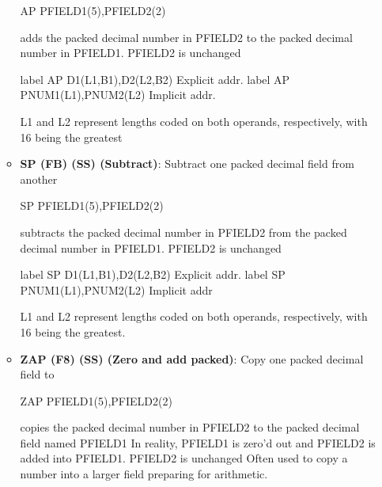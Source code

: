 \documentclass{report}
\begin{document}
\begin{itemize}
\begin{itemize}
\begin{cppcode}
                    AP PFIELD1(5),PFIELD2(2)
                    \end{cppcode}
                    \bigbreak \noindent 
                    adds the packed decimal number in PFIELD2 to the packed decimal number in PFIELD1. PFIELD2 is unchanged
                    \bigbreak \noindent 
                    \begin{cppcode}
                        label AP D1(L1,B1),D2(L2,B2) Explicit addr.
                        label AP PNUM1(L1),PNUM2(L2) Implicit addr.
                    \end{cppcode}
                    \bigbreak \noindent 
                    L1 and L2 represent lengths coded on both operands, respectively, with 16 being the greatest
                \item \textbf{SP (FB) (SS) (Subtract)}: Subtract one packed decimal field from another
                    \bigbreak \noindent 
                    \begin{cppcode}
                    SP PFIELD1(5),PFIELD2(2)
                    \end{cppcode}
                    \bigbreak \noindent 
                    subtracts the packed decimal number in PFIELD2 from the packed decimal number in PFIELD1. PFIELD2 is unchanged
                    \bigbreak \noindent 
                    \begin{cppcode}
                        label SP D1(L1,B1),D2(L2,B2) Explicit addr.
                        label SP PNUM1(L1),PNUM2(L2) Implicit addr
                    \end{cppcode}
                    \bigbreak \noindent 
                    L1 and L2 represent lengths coded on both operands, respectively, with 16 being the greatest.
                \item \textbf{ZAP (F8) (SS) (Zero and add packed)}: Copy one packed decimal field to
                    \bigbreak \noindent 
                    \begin{cppcode}
                    ZAP PFIELD1(5),PFIELD2(2)
                    \end{cppcode}
                    \bigbreak \noindent 
                    copies the packed decimal number in PFIELD2 to the packed decimal field named PFIELD1
                    \bigbreak \noindent 
                    In reality, PFIELD1 is zero'd out and PFIELD2 is added into PFIELD1. PFIELD2 is unchanged
                    \bigbreak \noindent 
                    Often used to copy a number into a larger field preparing for arithmetic.

\end{itemize}
\end{itemize}
\end{document}
